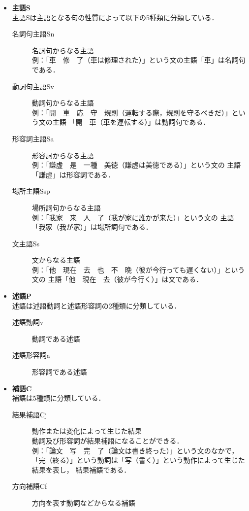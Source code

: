 \documentclass[japanese]{jnlp_1.3a}
\begin{document}
\begin{itemize}
\item {\bf 主語S}\\
  主語Sは主語となる句の性質によって以下の5種類に分類している．
  \begin{description}
  \item[名詞句主語Sn]名詞句からなる主語\\
    例：「車　修　了（車は修理された）」という文の主語「車」は名詞句である．
  \item[動詞句主語Sv]動詞句からなる主語\\
    例：「開　車　応　守　規則（運転する際，規則を守るべきだ）」という文の主語
    「開　車（車を運転する）」は動詞句である．
  \item[形容詞主語Sa]形容詞からなる主語\\
    例：「謙虚　是　一種　美徳（謙虚は美徳である）」という文の
    主語 「謙虚」は形容詞である．
  \item[場所主語Ssp]場所詞句からなる主語\\
    例：「我家　来　人　了（我が家に誰かが来た）」という文の
    主語 「我家（我が家）」は場所詞句である．
  \item[文主語Ss]文からなる主語\\
    例：「他　現在　去　也　不　晩（彼が今行っても遅くない）」という文の
    主語「他　現在　去（彼が今行く）」は文である．
  \end{description}
\item {\bf 述語P}\\
  述語は述語動詞と述語形容詞の2種類に分類している．
  \begin{description}
  \item[述語動詞v]動詞である述語
  \item[述語形容詞a]形容詞である述語
  \end{description}
\item {\bf 補語C}\\
  補語は5種類に分類している．
  \begin{description}
  \item[結果補語Cj]動作または変化によって生じた結果\\
    動詞及び形容詞が結果補語になることができる．\\
    例：「論文　写　完　了（論文は書き終った）」という文のなかで，
    「完（終る）」という動詞は「写（書く）」という動作によって生じた結果を表し，
    結果補語である．
  \item[方向補語Cf]方向を表す動詞などからなる補語\\

\end{description}
\end{itemize}
\end{document}
